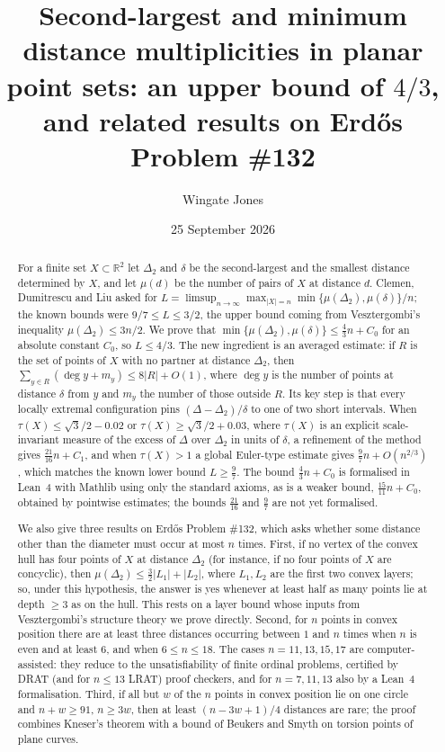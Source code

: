\documentclass[11pt]{amsart}
\title[Second-largest and minimum distance multiplicities]{Second-largest and minimum distance multiplicities in planar point sets: an upper bound of $4/3$, and related results on Erd\H{o}s Problem \#132}
\author{Wingate Jones}
\date{25 September 2026}
\theoremstyle{definition}
\theoremstyle{remark}
\newcommand{\R}{\mathbb{R}}
\newcommand{\Dt}{\Delta_2}
\newcommand{\mult}{\mu}
\begin{document}
\begin{abstract}
For a finite set $X\subset\R^2$ let $\Dt$ and $\delta$ be the second-largest and the smallest distance determined by $X$, and let $\mult(d)$ be the number of pairs of $X$ at distance $d$. Clemen, Dumitrescu and Liu asked for
$L=\limsup_{n\to\infty}\max_{|X|=n}\min\{\mult(\Dt),\mult(\delta)\}/n$; the known bounds were $9/7\le L\le 3/2$, the upper bound coming from Vesztergombi's inequality $\mult(\Dt)\le 3n/2$. We prove that $\min\{\mult(\Dt),\mult(\delta)\}\le \tfrac43n+C_0$ for an absolute constant $C_0$, so $L\le 4/3$. The new ingredient is an averaged estimate: if $R$ is the set of points of $X$ with no partner at distance $\Dt$, then $\sum_{y\in R}(\deg y+m_y)\le 8|R|+O(1)$, where $\deg y$ is the number of points at distance $\delta$ from $y$ and $m_y$ the number of those outside $R$. Its key step is that every locally extremal configuration pins $(\Delta-\Dt)/\delta$ to one of two short intervals. When $\tau(X)\le\sqrt3/2-0.02$ or $\tau(X)\ge\sqrt3/2+0.03$, where $\tau(X)$ is an explicit scale-invariant measure of the excess of $\Delta$ over $\Dt$ in units of $\delta$, a refinement of the method gives $\tfrac{21}{16}n+C_1$, and when $\tau(X)>1$ a global Euler-type estimate gives $\tfrac97n+O(n^{2/3})$, which matches the known lower bound $L\ge\frac97$. The bound $\tfrac43n+C_0$ is formalised in Lean~4 with Mathlib using only the standard axioms, as is a weaker bound, $\tfrac{15}{11}n+C_0$, obtained by pointwise estimates; the bounds $\tfrac{21}{16}$ and $\tfrac97$ are not yet formalised.

We also give three results on Erd\H{o}s Problem \#132, which asks whether some distance other than the diameter must occur at most $n$ times. First, if no vertex of the convex hull has four points of $X$ at distance $\Dt$ (for instance, if no four points of $X$ are concyclic), then $\mult(\Dt)\le\tfrac32|L_1|+|L_2|$, where $L_1,L_2$ are the first two convex layers; so, under this hypothesis, the answer is yes whenever at least half as many points lie at depth $\ge 3$ as on the hull. This rests on a layer bound whose inputs from Vesztergombi's structure theory we prove directly. Second, for $n$ points in convex position there are at least three distances occurring between $1$ and $n$ times when $n$ is even and at least $6$, and when $6\le n\le18$. The cases $n=11,13,15,17$ are computer-assisted: they reduce to the unsatisfiability of finite ordinal problems, certified by DRAT (and for $n\le13$ LRAT) proof checkers, and for $n=7,11,13$ also by a Lean~4 formalisation. Third, if all but $w$ of the $n$ points in convex position lie on one circle and $n+w\ge91$, $n\ge3w$, then at least $(n-3w+1)/4$ distances are rare; the proof combines Kneser's theorem with a bound of Beukers and Smyth on torsion points of plane curves.
\end{abstract}
\end{document}
